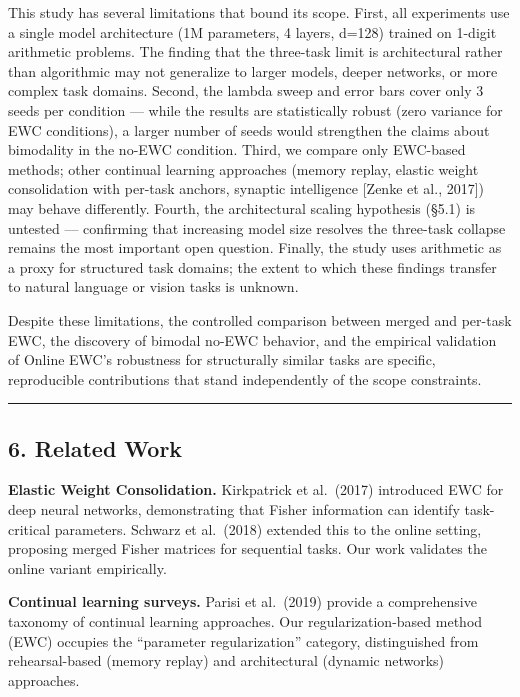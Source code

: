 \documentclass[
]{article}
\begin{document}
This study has several limitations that bound its scope. First, all
experiments use a single model architecture (1M parameters, 4 layers,
d=128) trained on 1-digit arithmetic problems. The finding that the
three-task limit is architectural rather than algorithmic may not
generalize to larger models, deeper networks, or more complex task
domains. Second, the lambda sweep and error bars cover only 3 seeds per
condition --- while the results are statistically robust (zero variance
for EWC conditions), a larger number of seeds would strengthen the
claims about bimodality in the no-EWC condition. Third, we compare only
EWC-based methods; other continual learning approaches (memory replay,
elastic weight consolidation with per-task anchors, synaptic
intelligence {[}Zenke et al., 2017{]}) may behave differently. Fourth,
the architectural scaling hypothesis (§5.1) is untested --- confirming
that increasing model size resolves the three-task collapse remains the
most important open question. Finally, the study uses arithmetic as a
proxy for structured task domains; the extent to which these findings
transfer to natural language or vision tasks is unknown.

Despite these limitations, the controlled comparison between merged and
per-task EWC, the discovery of bimodal no-EWC behavior, and the
empirical validation of Online EWC's robustness for structurally similar
tasks are specific, reproducible contributions that stand independently
of the scope constraints.

\begin{center}\rule{0.5\linewidth}{0.5pt}\end{center}

\subsection{6. Related Work}\label{related-work}

\textbf{Elastic Weight Consolidation.} Kirkpatrick et al.~(2017)
introduced EWC for deep neural networks, demonstrating that Fisher
information can identify task-critical parameters. Schwarz et al.~(2018)
extended this to the online setting, proposing merged Fisher matrices
for sequential tasks. Our work validates the online variant empirically.

\textbf{Continual learning surveys.} Parisi et al.~(2019) provide a
comprehensive taxonomy of continual learning approaches. Our
regularization-based method (EWC) occupies the ``parameter
regularization'' category, distinguished from rehearsal-based (memory
replay) and architectural (dynamic networks) approaches.
\end{document}
